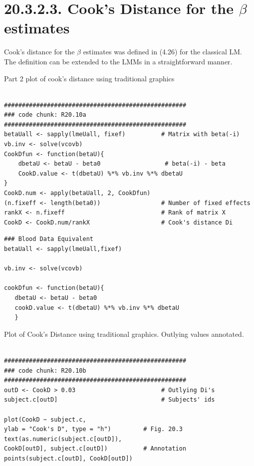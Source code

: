 \documentclass[a4paper,12pt]{article}
\begin{document}
\section{20.3.2.3. Cook's Distance for the $\beta$ estimates}

Cook's distance for the $\beta$ estimates was defined in (4.26) for the classical LM.
The definition can be extended to the LMMs in a straightforward manner.


Part 2 plot of cook's distance using traditional graphics


\begin{framed}
	\begin{verbatim}

###################################################
### code chunk: R20.10a
###################################################
betaUall <- sapply(lmeUall, fixef)          # Matrix with beta(-i)
vb.inv <- solve(vcovb)                       
CookDfun <- function(betaU){  
	dbetaU <- betaU - beta0                  # beta(-i) - beta
	CookD.value <- t(dbetaU) %*% vb.inv %*% dbetaU 
}
CookD.num <- apply(betaUall, 2, CookDfun)
(n.fixeff <- length(beta0))                 # Number of fixed effects
rankX <- n.fixeff                           # Rank of matrix X
CookD <- CookD.num/rankX                    # Cook's distance Di
\end{verbatim}
\end{framed}
\begin{framed}
\begin{verbatim}
### Blood Data Equivalent
betaUall <- sapply(lmeUall,fixef)

vb.inv <- solve(vcovb)

cookDfun <- function(betaU){
   dbetaU <- betaU - beta0
   cookD.value <- t(dbetaU) %*% vb.inv %*% dbetaU
   }
\end{verbatim}
\end{framed}

Plot of Cook's Distance using traditional graphics. 
Outlying values annotated.

\begin{framed}
\begin{verbatim}

###################################################
### code chunk: R20.10b
###################################################
outD <- CookD > 0.03                        # Outlying Di's
subject.c[outD]                             # Subjects' ids 

plot(CookD ~ subject.c, 
ylab = "Cook's D", type = "h")         # Fig. 20.3
text(as.numeric(subject.c[outD]),
CookD[outD], subject.c[outD])          # Annotation 
points(subject.c[outD], CookD[outD])
\end{verbatim}
\end{framed}
\end{document}
